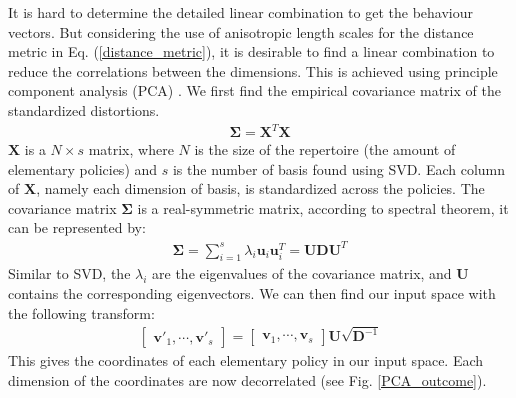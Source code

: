 \documentclass[journal]{IEEEtran}
\begin{document}
It is hard to determine the detailed linear combination to get the behaviour vectors.
But considering the use of anisotropic length scales for the distance metric in Eq. (\ref{distance_metric}), it is desirable to find a linear combination to reduce the correlations between the dimensions.
This is achieved using principle component analysis (PCA) \cite{PCA}. We first find the empirical covariance matrix of the standardized distortions.
\begin{equation}
\begin{gathered}
\bm{\Sigma} = \bm{X}^T \bm{X}
\end{gathered}
\label{cov}
\end{equation}
$\bm{X}$ is a $N \times s$ matrix, where $N$ is the size of the repertoire (the amount of elementary policies) and $s$ is the number of basis found using SVD.
Each column of $\bm{X}$, namely each dimension of basis, is standardized across the policies.
The covariance matrix $\bm{\Sigma}$ is a real-symmetric matrix, according to spectral theorem, it can be represented by:
\begin{equation}
\begin{gathered}
\bm{\Sigma} = 
\sum_{i=1}^s \lambda_i \bm{u}_i \bm{u}_i^T = \bm{U} \bm{D} \bm{U}^T
\end{gathered}
\label{PCA}
\end{equation}
Similar to SVD, the $\lambda_i$ are the eigenvalues of the covariance matrix, and $\bm{U}$ contains the corresponding eigenvectors.
We can then find our input space with the following transform:
\begin{equation}
\begin{gathered}
\begin{bmatrix}
\bm{v}'_1, \cdots, \bm{v}'_s
\end{bmatrix}
=
\begin{bmatrix}
\bm{v}_1, \cdots, \bm{v}_s
\end{bmatrix}
\bm{U} \sqrt{\bm{D}^{-1}}
\end{gathered}
\label{input_space}
\end{equation}
This gives the coordinates of each elementary policy in our input space. Each dimension of the coordinates are now decorrelated (see Fig. \ref{PCA_outcome}).
%
\end{document}
